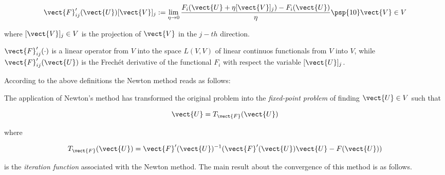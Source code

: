 \begin{equation}
\vect{F}'_{ij}(\vect{U})[\vect{V}]_j := \lim_{\eta \to 0}\dfrac{F_i(\vect{U}+\eta [\vect{V}]_j)-F_i(\vect{U})}{\eta}  \psp{10} \vect{V} \in V
\end{equation}

where $[\vect{V}]_j \in V$ is the projection  of  $\vect{V}$ in the $j-th$ direction. 

$\vect{F}'_{ij}(\cdot)$ is a linear operator from $V$ into the space $L(V,V)$ of linear continuos functionals from $V$ into $V$, while $\vect{F}'_{ij}(\vect{U})$ is the Frech\'et derivative of the functional $F_i$ with respect the variable $[\vect{U}]_j$.

According to the above definitions the Newton method reads as follows:


\vspace{0.3cm}
The application of Newton's method has transformed the original problem  into the \textit{fixed-point problem} of finding $\vect{U} \in V$ such that

\begin{equation}
\label{eq: fixed point U}
\vect{U} = T_{\vect{F}}(\vect{U})
\end{equation}

where 

\begin{equation}
\label{eq: iteration function}
T_{\vect{F}}(\vect{U}) = \vect{F}'(\vect{U})^{-1}(\vect{F}'(\vect{U})\vect{U}-F(\vect{U}))
\end{equation}

is the \textit{iteration function} associated with the Newton method.
The main result about the convergence of this method is as follows.

